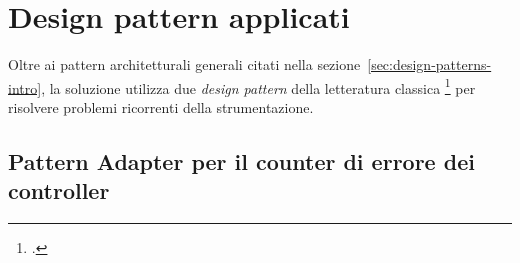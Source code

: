 \section{Design pattern applicati}
\label{sec:design-patterns}

Oltre ai pattern architetturali generali citati nella sezione~\ref{sec:design-patterns-intro},
la soluzione utilizza due \emph{design pattern} della letteratura classica
\footcite{Book:GoF:DesignPatterns} per risolvere problemi ricorrenti della strumentazione.

\subsection{Pattern Adapter per il counter di errore dei controller}
\label{subsec:pattern-adapter-controller-errors}

